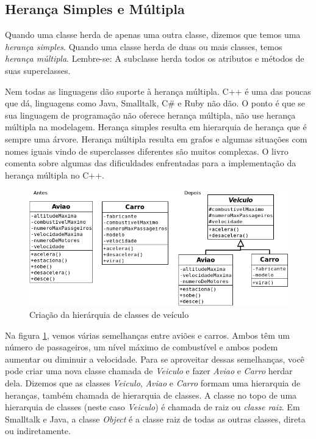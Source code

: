 \subsection{Herança Simples e Múltipla}

Quando uma classe herda de apenas uma outra classe, dizemos que temos uma \emph{herança simples}. Quando uma classe herda de duas ou mais classes, temos \emph{herança múltipla}. Lembre-se: A subclasse herda todos os atributos e métodos de suas superclasses.

Nem todas as linguagens dão suporte à herança múltipla. C++ é uma das poucas que dá, linguagens como Java, Smalltalk, C\# e Ruby não dão. O ponto é que se sua linguagem de programação não oferece herança múltipla, não use herança múltipla na modelagem. Herança simples resulta em hierarquia de herança que é sempre uma árvore. Herança múltipla resulta em grafos e algumas situações com nomes iguais vindo de superclasses diferentes são muitos complexas. O livro \cite{cpp:ref} comenta sobre algumas das dificuldades enfrentadas para a implementação da herança múltipla no C++.

\begin{figure}[h]
\begin{center}
\includegraphics[scale=0.6]{uml3.png} 
\caption{Criação da hierárquia de classes de veículo} \label{fig:uml3}
\end{center}
\end{figure}

Na figura \ref{fig:uml3}, vemos várias semelhanças entre aviões e carros. Ambos têm um número de passageiros, um nível máximo de combustível e ambos podem aumentar ou diminuir a velocidade. Para se aproveitar dessas semelhanças, você pode criar uma nova classe chamada de \emph{Veiculo} e fazer \emph{Aviao} e \emph{Carro} herdar dela. Dizemos que as classes \emph{Veiculo}, \emph{Aviao} e \emph{Carro} formam uma hierarquia de heranças, também chamada de hierarquia de classes. A classe no topo de uma hierarquia de classes (neste caso \emph{Veiculo}) é chamada de raiz ou \emph{classe raiz}. Em Smalltalk e Java, a classe \emph{Object} é a classe raiz de todas as outras classes, direta ou indiretamente.


